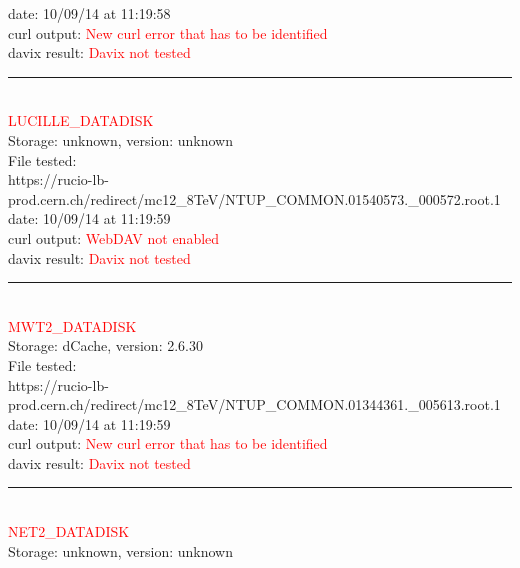 date: 10/09/14 at 11:19:58\\

curl output:  \textcolor{red}{New curl error that has to be identified}\\

davix result:  \textcolor{red}{Davix not tested}\\

\rule{\textwidth}{1pt}\\

\textcolor{red}{\normalsize{LUCILLE\_DATADISK}}\\

Storage: unknown, version: unknown\\

File tested:\\
\footnotesize{https://rucio-lb-prod.cern.ch/redirect/mc12\_8TeV/NTUP\_COMMON.01540573.\_000572.root.1}\\

date: 10/09/14 at 11:19:59\\

curl output:  \textcolor{red}{WebDAV not enabled}\\

davix result:  \textcolor{red}{Davix not tested}\\

\rule{\textwidth}{1pt}\\

\textcolor{red}{\normalsize{MWT2\_DATADISK}}\\

Storage: dCache, version: 2.6.30\\

File tested:\\
\footnotesize{https://rucio-lb-prod.cern.ch/redirect/mc12\_8TeV/NTUP\_COMMON.01344361.\_005613.root.1}\\

date: 10/09/14 at 11:19:59\\

curl output:  \textcolor{red}{New curl error that has to be identified}\\

davix result:  \textcolor{red}{Davix not tested}\\

\rule{\textwidth}{1pt}\\

\textcolor{red}{\normalsize{NET2\_DATADISK}}\\

Storage: unknown, version: unknown\\

